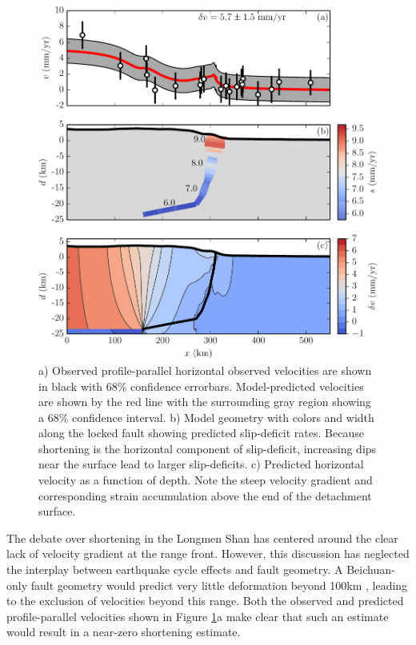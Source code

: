 \documentclass[12pt]{article}
\begin{document}
\begin{figure}[h!]
    \centering
    \includegraphics{figs/stack_figure_all_details.pdf}
    \caption{a) Observed profile-parallel horizontal observed velocities are shown in black with 68\% confidence errorbars. Model-predicted velocities are shown by the red line with the surrounding gray region showing a 68\% confidence interval. b) Model geometry with colors and width along the locked fault showing predicted slip-deficit rates. Because shortening is the horizontal component of slip-deficit, increasing dips near the surface lead to larger slip-deficits. c) Predicted horizontal velocity as a function of depth. Note the steep velocity gradient and corresponding strain accumulation above the end of the detachment surface.}
    \label{fig:big_stack}
\end{figure}


The debate over shortening in the Longmen Shan has centered around the clear lack of velocity gradient at the range front. However, this discussion has neglected the interplay between earthquake cycle effects and fault geometry. A Beichuan-only fault geometry would predict very little deformation beyond 100km \citep{savage83}, leading to the exclusion of velocities beyond this range. Both the observed and predicted profile-parallel velocities shown in Figure \ref{fig:big_stack}a make clear that such an estimate would result in a near-zero shortening estimate.
\end{document}
